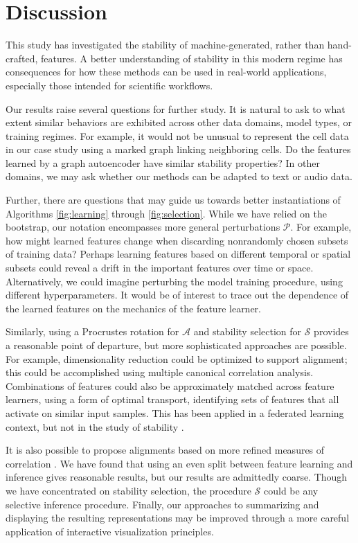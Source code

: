
\section{Discussion}

This study has investigated the stability of machine-generated, rather than
hand-crafted, features. A better understanding of stability in this modern
regime has consequences for how these methods can be used in real-world
applications, especially those intended for scientific workflows.

Our results raise several questions for further study. It is natural to ask
to what extent similar behaviors are exhibited across other data domains, model
types, or training regimes. For example, it would not be unusual to represent
the cell data in our case study using a marked graph linking neighboring cells.
Do the features learned by a graph autoencoder have similar stability
properties? In other domains, we may ask whether our methods can be adapted to
text or audio data.

Further, there are questions that may guide us towards better instantiations of
Algorithms \ref{fig:learning} through \ref{fig:selection}. While we have relied
on the bootstrap, our notation encompasses more general perturbations
$\mathcal{P}$. For example, how might learned features change when discarding
nonrandomly chosen subsets of training data? Perhaps learning features based on
different temporal or spatial subsets could reveal a drift in the important
features over time or space. Alternatively, we could imagine perturbing the
model training procedure, using different hyperparameters. It would be of
interest to trace out the dependence of the learned features on the mechanics of
the feature learner.

Similarly, using a Procrustes rotation for $\mathcal{A}$ and stability selection
for $\mathcal{S}$ provides a reasonable point of departure, but more
sophisticated approaches are possible. For example, dimensionality reduction
could be optimized to support alignment; this could be accomplished using
multiple canonical correlation analysis. Combinations of features could also be
approximately matched across feature learners, using a form of optimal
transport, identifying sets of features that all activate on similar input
samples. This has been applied in a federated learning context, but not in the
study of stability \citep{wang2020federated}.

It is also possible to propose alignments based on more refined measures of
correlation \citep{josse2016measuring, azadkia2019simple}. We have found that
using an even split between feature learning and inference gives reasonable
results, but our results are admittedly coarse. Though we have concentrated on
stability selection, the procedure $\mathcal{S}$ could be any selective
inference procedure. Finally, our approaches to summarizing and displaying the
resulting representations may be improved through a more careful application of
interactive visualization principles.

